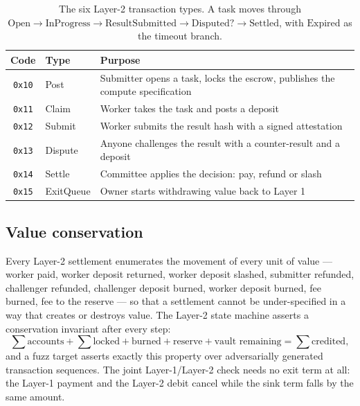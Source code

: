 \documentclass{article}
\begin{document}
\begin{table}[t]
\centering
\begin{tabular}{cll}
\toprule
\textbf{Code} & \textbf{Type} & \textbf{Purpose} \\
\midrule
\texttt{0x10} & Post & Submitter opens a task, locks the escrow, publishes the
  compute specification \\
\texttt{0x11} & Claim & Worker takes the task and posts a deposit \\
\texttt{0x12} & Submit & Worker submits the result hash with a signed
  attestation \\
\texttt{0x13} & Dispute & Anyone challenges the result with a counter-result
  and a deposit \\
\texttt{0x14} & Settle & Committee applies the decision: pay, refund or slash \\
\texttt{0x15} & ExitQueue & Owner starts withdrawing value back to Layer 1 \\
\bottomrule
\end{tabular}
\caption{The six Layer-2 transaction types. A task moves through
$\text{Open} \rightarrow \text{InProgress} \rightarrow \text{ResultSubmitted}
\rightarrow \text{Disputed?} \rightarrow \text{Settled}$, with $\text{Expired}$
as the timeout branch.}
\label{tab:l2types}
\end{table}

\subsection{Value conservation}

Every Layer-2 settlement enumerates the movement of every unit of value ---
worker paid, worker deposit returned, worker deposit slashed, submitter
refunded, challenger refunded, challenger deposit burned, worker deposit
burned, fee burned, fee to the reserve --- so that a settlement cannot be
under-specified in a way that creates or destroys value. The Layer-2 state
machine asserts a conservation invariant after every step:
\begin{equation}
\sum \text{accounts} + \sum \text{locked} + \text{burned} + \text{reserve}
+ \text{vault remaining} = \sum \text{credited} ,
\label{eq:conservation}
\end{equation}
and a fuzz target asserts exactly this property over adversarially generated
transaction sequences. The joint Layer-1/Layer-2 check needs no exit term at
all: the Layer-1 payment and the Layer-2 debit cancel while the sink term falls
by the same amount.
\end{document}
